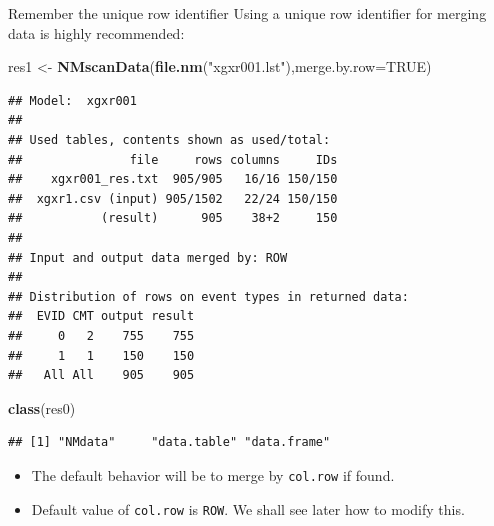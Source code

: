\documentclass[
  8pt,
  ignorenonframetext,
  aspectratio=169]{beamer}
\newenvironment{Shaded}{\begin{snugshade}}{\end{snugshade}}
\newcommand{\DataTypeTok}[1]{\textcolor[rgb]{0.13,0.29,0.53}{#1}}
\newcommand{\KeywordTok}[1]{\textcolor[rgb]{0.13,0.29,0.53}{\textbf{#1}}}
\newcommand{\NormalTok}[1]{#1}
\newcommand{\OtherTok}[1]{\textcolor[rgb]{0.56,0.35,0.01}{#1}}
\newcommand{\StringTok}[1]{\textcolor[rgb]{0.31,0.60,0.02}{#1}}
\providecommand{\tightlist}{%
  \setlength{\itemsep}{0pt}\setlength{\parskip}{0pt}}
\begin{document}
\begin{frame}[fragile]{Remember the unique row identifier}
\protect\hypertarget{remember-the-unique-row-identifier}{}
Using a unique row identifier for merging data is highly recommended:

\footnotesize

\begin{Shaded}
\begin{Highlighting}[]
\NormalTok{res1 \textless{}{-}}\StringTok{ }\KeywordTok{NMscanData}\NormalTok{(}\KeywordTok{file.nm}\NormalTok{(}\StringTok{"xgxr001.lst"}\NormalTok{),}\DataTypeTok{merge.by.row=}\OtherTok{TRUE}\NormalTok{)}
\end{Highlighting}
\end{Shaded}

\begin{verbatim}
## Model:  xgxr001 
## 
## Used tables, contents shown as used/total:
##               file     rows columns     IDs
##    xgxr001_res.txt  905/905   16/16 150/150
##  xgxr1.csv (input) 905/1502   22/24 150/150
##           (result)      905    38+2     150
## 
## Input and output data merged by: ROW 
## 
## Distribution of rows on event types in returned data:
##  EVID CMT output result
##     0   2    755    755
##     1   1    150    150
##   All All    905    905
\end{verbatim}

\begin{Shaded}
\begin{Highlighting}[]
\KeywordTok{class}\NormalTok{(res0)}
\end{Highlighting}
\end{Shaded}

\begin{verbatim}
## [1] "NMdata"     "data.table" "data.frame"
\end{verbatim}

\normalsize

\begin{itemize}
\tightlist
\item
  The default behavior will be to merge by \texttt{col.row} if found.
\item
  Default value of \texttt{col.row} is \texttt{ROW}. We shall see later
  how to modify this.
\end{itemize}
\end{frame}
\end{document}
